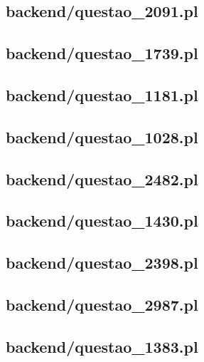 \subsection*{backend/questao\_2091.pl}


\subsection*{backend/questao\_1739.pl}


\subsection*{backend/questao\_1181.pl}


\subsection*{backend/questao\_1028.pl}


\subsection*{backend/questao\_2482.pl}


\subsection*{backend/questao\_1430.pl}


\subsection*{backend/questao\_2398.pl}


\subsection*{backend/questao\_2987.pl}


\subsection*{backend/questao\_1383.pl}


